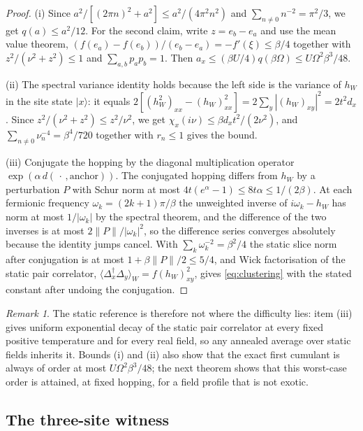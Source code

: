 \documentclass[11pt]{article}
\theoremstyle{definition}
\theoremstyle{remark}
\newtheorem{remark}[theorem]{Remark}
\begin{document}
\begin{proof}
(i) Since $a^2/[(2\pi n)^2+a^2]\le a^2/(4\pi^2n^2)$ and $\sum_{n\ne0}n^{-2}=\pi^2/3$,
we get $q(a)\le a^2/12$. For the second claim, write $z=e_b-e_a$ and use the mean
value theorem, $(f(e_a)-f(e_b))/(e_b-e_a)=-f'(\xi)\le\beta/4$ together with
$z^2/(\nu^2+z^2)\le1$ and $\sum_{a,b}p_ap_b=1$. Then
$a_x\le(\beta U/4)q(\beta\Omega)\le U\Omega^2\beta^3/48$.

(ii) The spectral variance identity holds because the left side is the variance of
$h_W$ in the site state $|x\rangle$: it equals
$2[(h_W^2)_{xx}-(h_W)_{xx}^2]=2\sum_{y}|(h_W)_{xy}|^2=2t^2d_x$. Since
$z^2/(\nu^2+z^2)\le z^2/\nu^2$, we get $\chi_x(i\nu)\le\beta d_xt^2/(2\nu^2)$, and
$\sum_{n\ne0}\nu_n^{-4}=\beta^4/720$ together with $r_n\le1$ gives the bound.

(iii) Conjugate the hopping by the diagonal multiplication operator
$\exp(\alpha\,d(\,\cdot\,,\text{anchor}))$. The conjugated hopping differs from $h_W$
by a perturbation $P$ with Schur norm at most $4t(e^{\alpha}-1)\le8t\alpha\le
1/(2\beta)$. At each fermionic frequency $\omega_k=(2k+1)\pi/\beta$ the unweighted
inverse of $i\omega_k-h_W$ has norm at most $1/|\omega_k|$ by the spectral theorem,
and the difference of the two inverses is at most $2\|P\|/|\omega_k|^2$, so the
difference series converges absolutely because the identity jumps cancel. With
$\sum_k\omega_k^{-2}=\beta^2/4$ the static slice norm after conjugation is at most
$1+\beta\|P\|/2\le5/4$, and Wick factorisation of the static pair correlator,
$\langle\Delta_x^\dagger\Delta_y\rangle_W=f(h_W)_{xy}^2$, gives
\eqref{eq:clustering} with the stated constant after undoing the conjugation.
\end{proof}

\begin{remark}
The static reference is therefore not where the difficulty lies: item (iii) gives
uniform exponential decay of the static pair correlator at every fixed positive
temperature and for every real field, so any annealed average over static fields
inherits it. Bounds (i) and (ii) also show that the exact first cumulant is always of
order at most $U\Omega^2\beta^3/48$; the next theorem shows that this worst-case
order is attained, at fixed hopping, for a field profile that is not exotic.
\end{remark}

\subsection{The three-site witness}
\end{document}
